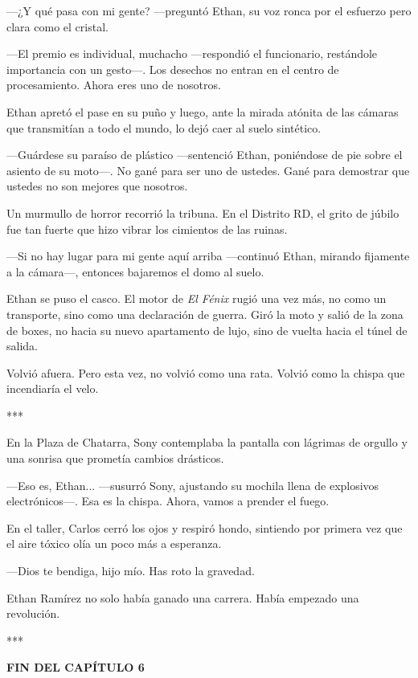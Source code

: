\documentclass[11pt,twoside]{book}
\begin{document}
---¿Y qué pasa con mi gente? ---preguntó Ethan, su voz ronca por el esfuerzo pero clara como el cristal.

---El premio es individual, muchacho ---respondió el funcionario, restándole importancia con un gesto---. Los desechos no entran en el centro de procesamiento. Ahora eres uno de nosotros.

Ethan apretó el pase en su puño y luego, ante la mirada atónita de las cámaras que transmitían a todo el mundo, lo dejó caer al suelo sintético.

---Guárdese su paraíso de plástico ---sentenció Ethan, poniéndose de pie sobre el asiento de su moto---. No gané para ser uno de ustedes. Gané para demostrar que ustedes no son mejores que nosotros.

Un murmullo de horror recorrió la tribuna. En el Distrito RD, el grito de júbilo fue tan fuerte que hizo vibrar los cimientos de las ruinas.

---Si no hay lugar para mi gente aquí arriba ---continuó Ethan, mirando fijamente a la cámara---, entonces bajaremos el domo al suelo.

Ethan se puso el casco. El motor de \textit{El Fénix} rugió una vez más, no como un transporte, sino como una declaración de guerra. Giró la moto y salió de la zona de boxes, no hacia su nuevo apartamento de lujo, sino de vuelta hacia el túnel de salida.

Volvió afuera. Pero esta vez, no volvió como una rata. Volvió como la chispa que incendiaría el velo.

\bigskip
\begin{center}***\end{center}
\bigskip

En la Plaza de Chatarra, Sony contemplaba la pantalla con lágrimas de orgullo y una sonrisa que prometía cambios drásticos.

---Eso es, Ethan... ---susurró Sony, ajustando su mochila llena de explosivos electrónicos---. Esa es la chispa. Ahora, vamos a prender el fuego.

En el taller, Carlos cerró los ojos y respiró hondo, sintiendo por primera vez que el aire tóxico olía un poco más a esperanza.

---Dios te bendiga, hijo mío. Has roto la gravedad.

Ethan Ramírez no solo había ganado una carrera. Había empezado una revolución.

\bigskip
\begin{center}***\end{center}
\bigskip

\textbf{FIN DEL CAPÍTULO 6}
\end{document}
